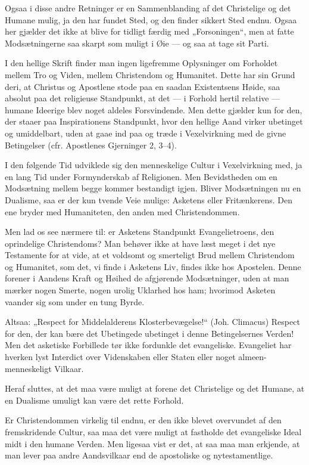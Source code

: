 \documentclass[12pt,a4paper]{book}
\newcommand{\opage}[1]{\marginnote{\footnotesize\textit{[#1]}}}
\begin{document}
Ogsaa i disse andre Retninger er en Sammenblanding
af det Christelige og det Humane mulig, ja den har fundet
Sted, og den finder sikkert Sted endnu. Ogsaa her gjælder
det ikke at blive for tidligt færdig med „Forsoningen“, men
at fatte Modsætningerne saa skarpt som muligt i Øie --- og
saa at tage sit Parti.

I den hellige Skrift finder man ingen ligefremme Oplysninger
om Forholdet mellem Tro og Viden, mellem Christendom
og Humanitet. Dette har sin Grund deri, at Christus
og Apostlene stode paa en saadan Existentsens Høide, saa
absolut paa det religieuse Standpunkt, at det --- i Forhold
hertil relative --- humane Ideerige blev noget aldeles Forsvindende.
Men dette gjælder kun for den, der staaer paa
Inspirationens Standpunkt, hvor den hellige Aand virker ubetinget
og umiddelbart, uden at gaae ind paa og træde i Vexelvirkning
med de givne Betingelser (cfr. Apostlenes Gjerninger
2, 3--4).

I den følgende Tid udviklede sig den menneskelige Cultur
i Vexelvirkning med, ja en lang Tid under Formynderskab af
\opage{43}\setcounter{footnote}{0}%
Religionen. Men Bevidstheden om en Modsætning mellem
begge kommer bestandigt igjen. Bliver Modsætningen nu en
Dualisme, saa er der kun tvende Veie mulige: Asketens eller
Fritænkerens. Den ene bryder med Humaniteten, den anden
med Christendommen.

Men lad os see nærmere til: er Asketens Standpunkt
Evangelietroens, den oprindelige Christendoms? Man behøver
ikke at have læst meget i det nye Testamente for at vide, at
et voldsomt og smerteligt Brud mellem Christendom og Humanitet,
som det, vi finde i Asketens Liv, findes ikke hos
Apostelen. Denne forener i Aandens Kraft og Høihed de afgjørende
Modsætninger, uden at man mærker nogen Smerte,
nogen urolig Uklarhed hos ham; hvorimod Asketen vaander sig
som under en tung Byrde.

Altsaa: „Respect for Middelalderens Klosterbevægelse!“
(Joh. Climacus) Respect for den, der kan bære det Ubetingede
ubetinget i denne Betingelsernes Verden! Men det asketiske
Forbillede tør ikke fordunkle det evangeliske. Evangeliet har
hverken lyst Interdict over Videnskaben eller Staten eller noget
almeen-menneskeligt Vilkaar.

Heraf sluttes, at det maa være muligt at forene det
Christelige og det Humane, at en Dualisme umuligt kan være
det rette Forhold.

Er Christendommen virkelig til endnu, er den ikke blevet
overvundet af den fremskridende Cultur, saa maa det være muligt
at fastholde det evangeliske Ideal midt i den humane Verden.
Men ligesaa vist er det, at saa maa man erkjende, at man
lever paa andre Aandsvilkaar end de apostoliske og nytestamentlige.
\end{document}
